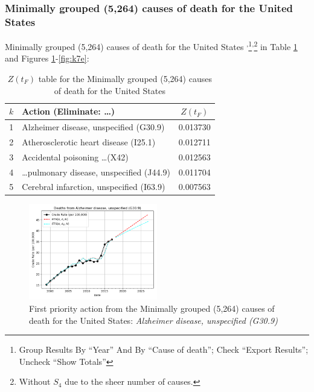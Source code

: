 \documentclass[10pt, a4paper, twocolumn]{IEEEconf}
\begin{document}
\clearpage

\subsubsection{Minimally grouped (5,264) causes of death for the United States}

Minimally grouped (5,264) causes of death for the United States \citep{centers2017underlying}\textsuperscript{,}\footnote{Group Results By \enquote{Year} And By \enquote{Cause of death}; Check \enquote{Export Results}; Uncheck \enquote{Show Totals}}\textsuperscript{,}\footnote{Without $S_4$ due to the sheer number of causes.} in Table \ref{table:ztable7} and Figures \ref{fig:k7a}-\ref{fig:k7e}:

\begin{table}[H]
  \centering
  \begin{tabular}{clc}
    \toprule
      $k$ & Action (Eliminate: \ldots) & $Z(t_F)$ \\
    \midrule
      1 &                                Alzheimer disease, unspecified (G30.9) & 0.013730 \\
      2 &                                 Atherosclerotic heart disease (I25.1) & 0.012711 \\
      3 &                                     Accidental poisoning \ldots (X42) & 0.012563 \\
      4 &                         \ldots pulmonary disease, unspecified (J44.9) & 0.011704 \\
      5 &                              Cerebral infarction, unspecified (I63.9) & 0.007563 \\
    \bottomrule
  \end{tabular}
  \caption{$Z(t_F)$ table for the Minimally grouped (5,264) causes of death for the United States}
  \label{table:ztable7}
\end{table}

\begin{figure}[H]
  \centering
  \includegraphics[width=0.5\textwidth]{results/US_ICD10_MINIMALLY_GROUPED/Alzheimer_disease_unspecified_G30_9_ets.png}
  \caption{First priority action from the Minimally grouped (5,264) causes of death for the United States: \textit{Alzheimer disease, unspecified (G30.9)}}\label{fig:k7a}
\end{figure}
\end{document}
